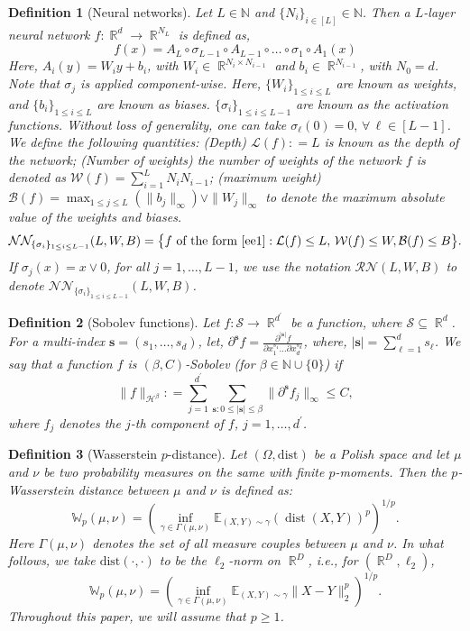 \documentclass[12pts]{article}
\newtheorem{defn}{Definition}%
\def\Real{\mathop{\mathbb{R}}\nolimits}
\newcommand{\bs}{\boldsymbol{s}}
\newcommand{\cB}{ \mathcal{B}}
\newcommand{\cL}{ \mathcal{L}}
\newcommand{\cN}{ \mathcal{N}}
\newcommand{\cR}{ \mathcal{R}}
\newcommand{\cW}{ \mathcal{W}}
\newcommand{\sH}{ \mathscr{H}}
\newcommand{\E}{\mathbb{E}}
\newcommand{\fW}{\mathbb{W}}
\begin{document}
\begin{defn}[Neural networks]\normalfont
 Let $L \in \mathbb{N}$ and $ \{N_i\}_{i \in [L]} \in \mathbb{N}$. Then a $L$-layer neural network $f: \Real^d \to \Real^{N_L}$ is defined as,
\begin{equation}
\label{ee1}
f(x) = A_L \circ \sigma_{L-1} \circ A_{L-1} \circ \dots \circ \sigma_1 \circ A_1 (x)    
\end{equation}
Here, $A_i(y) = W_i y + b_i$, with $W_i \in \Real^{N_{i} \times N_{i-1}}$ and $b_i \in \Real^{N_{i-1}}$, with $N_0 = d$. Note that $\sigma_j$ is applied component-wise.  Here, $\{W_i\}_{1 \le i \le L}$ are known as weights, and $\{b_i\}_{1 \le i \le L}$ are known as biases. $\{\sigma_i\}_{1 \le i \le L-1}$ are known as the activation functions. Without loss of generality, one can take $\sigma_\ell(0) = 0, \, \forall \, \ell \in [L-1]$. We define the following quantities:  
(Depth) $\cL(f) : = L$ is known as the depth of the network; (Number of weights) the number of weights of the network $f$ is denoted as  $\cW(f) = \sum_{i=1}^L N_i N_{i-1}$; 
(maximum weight) $\cB(f) = \max_{1 \le j \le L} (\|b_j\|_\infty) \vee \|W_j\|_{\infty}$ to denote the maximum absolute value of the weights and biases.
\begin{align*}
    \cN \cN_{\{\sigma_i\}_{1 \le i \le L-1}} (L, W, B) = \big\{  f \text{ of the form \eqref{ee1}}: \cL(f) \le L , \, \cW(f) \le W, \cB(f) \le B \big\}.
\end{align*}
 If $\sigma_j(x) = x \vee 0$, for all $j=1,\dots, L-1$, we use the notation $\cR \cN (L, W, B)$ to denote $\cN \cN_{\{\sigma_i\}_{1 \le i \le L-1}} (L, W, B)$.
 \end{defn}
\begin{defn}[Sobolev functions]\normalfont
Let $f: \mathcal{S} \to \Real^{d^\prime}$ be a function, where $\mathcal{S} \subseteq \Real^d$. For a multi-index $\bs = (s_1,\dots,s_d)$, let, $\partial^{\bs} f = \frac{\partial^{|\bs|} f}{\partial x_1^{s_1} \ldots \partial x_d^{s_d}}$, where, $|\bs| = \sum_{\ell = 1}^d s_\ell $. We say that a function $f$ is $(\beta,C)$-Sobolev (for $\beta \in \mathbb{N} \cup\{0\}$) if
\[ \|f\|_{\sH^\beta}: = \sum_{j=1}^{d^\prime}\sum_{\bs: 0 \le |\bs| \le \beta} \|\partial^{\bs} f_j\|_\infty \le C, \]
where $f_j$ denotes the $j$-th component of $f$, $j = 1, \ldots, d^\prime$.
\end{defn}
 \begin{defn}[Wasserstein $p$-distance] \normalfont
    Let $(\Omega,\text{dist})$ be a Polish space and let $\mu$ and $\nu$ be two probability measures on the same with finite $p$-moments. Then the $p$-Wasserstein distance between $\mu$ and $\nu$ is defined as:
    \[\fW_p(\mu, \nu) = \left(\inf_{\gamma \in \Gamma(\mu, \nu)} \E_{(X,Y) \sim \gamma} \left(\operatorname{dist}(X,Y)\right)^{p}\right)^{1/p}.\]
    Here $\Gamma(\mu, \nu)$ denotes the set of all measure couples between $\mu$ and $\nu$. In what follows, we take $\text{dist}(\cdot, \cdot)$ to be the $\ell_2$-norm on $\Real^D$, i.e., for $(\Real^D, \ell_2)$,
    \[\fW_p(\mu, \nu) = \left(\inf_{\gamma \in \Gamma(\mu, \nu)} \E_{(X,Y) \sim \gamma} \|X-Y\|_2^{p}\right)^{1/p}.\]
    Throughout this paper, we will assume that $p \ge 1$.
\end{defn}
\end{document}
